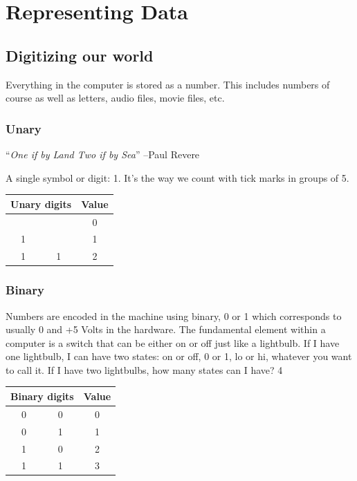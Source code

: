 \chapter{Representing Data}

\setcounter{problem}{1}

\section{Digitizing our world}

\begin{fullwidth}

Everything in the computer is stored as a number. This includes numbers of course as well as letters, audio files, movie files, etc.

\subsection{Unary}

``{\em One if by Land Two if by Sea}'' --Paul Revere

A single symbol or digit: 1.  It's the way we count with tick marks in groups of 5.

\begin{center}
\begin{tabular}{|cc|c|}
\hline
\multicolumn{2}{|c|}{Unary digits} & Value\\
\hline
 &  & 0\\
1 &  & 1\\
1 & 1 & 2\\
\hline
\end{tabular}
\end{center}

\subsection{Binary}

Numbers are encoded in the machine using binary, 0 or 1 which corresponds to usually 0 and +5 Volts in the hardware. The fundamental element within a computer is a switch that can be either on or off just like a lightbulb. If I have one lightbulb, I can have two states: on or off, 0 or 1, lo or hi, whatever you want to call it. If I have two lightbulbs, how many states can I have? 4

\begin{center}
\begin{tabular}{|cc|c|}
\hline
\multicolumn{2}{|c|}{Binary digits} & Value\\
\hline
0 & 0 & 0\\
0 & 1 & 1\\
1 & 0 & 2\\
1 & 1 & 3\\
\hline
\end{tabular}
\end{center}


\end{fullwidth}
